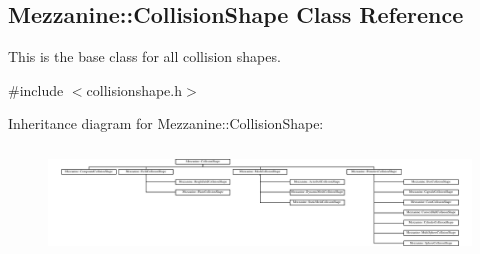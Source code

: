 \hypertarget{classMezzanine_1_1CollisionShape}{
\subsection{Mezzanine::CollisionShape Class Reference}
\label{classMezzanine_1_1CollisionShape}
}


This is the base class for all collision shapes.  




{\ttfamily \#include $<$collisionshape.h$>$}

Inheritance diagram for Mezzanine::CollisionShape:\begin{figure}[H]
\begin{center}
\leavevmode
\includegraphics[height=2.868526cm]{classMezzanine_1_1CollisionShape}
\end{center}
\end{figure}

